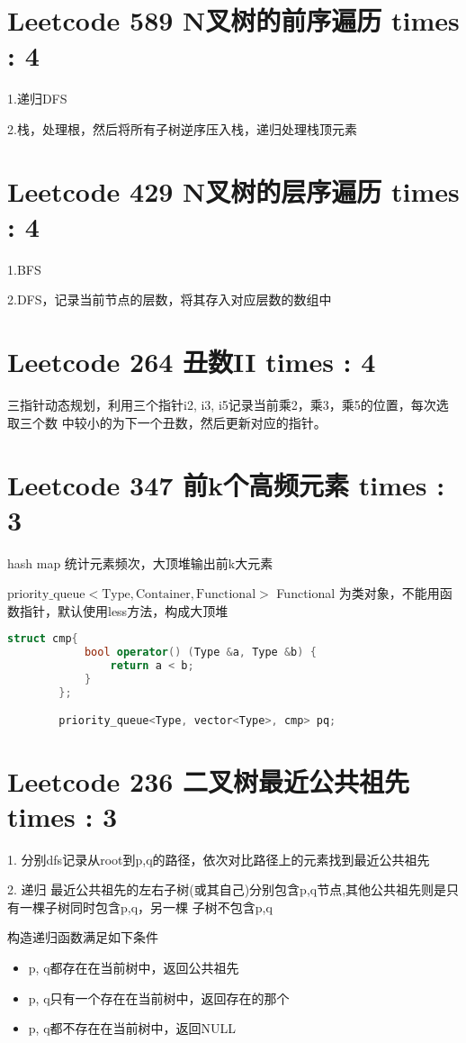\documentclass[UTF8]{ctexart}
\begin{document}
\section{Leetcode 589 N叉树的前序遍历 times : 4}
1.递归DFS

2.栈，处理根，然后将所有子树逆序压入栈，递归处理栈顶元素

\section{Leetcode 429 N叉树的层序遍历 times : 4}
1.BFS

2.DFS，记录当前节点的层数，将其存入对应层数的数组中

\section{Leetcode 264 丑数II times : 4}
三指针动态规划，利用三个指针i2, i3, i5记录当前乘2，乘3，乘5的位置，每次选取三个数
中较小的为下一个丑数，然后更新对应的指针。

\section{Leetcode 347 前k个高频元素 times : 3}
hash map 统计元素频次，大顶堆输出前k大元素

$\mathrm{priority\_queue<Type, Container, Functional>}$
Functional 为类对象，不能用函数指针，默认使用less方法，构成大顶堆
\begin{framed}
	\begin{lstlisting}[language=C++]
		struct cmp{
			bool operator() (Type &a, Type &b) {
				return a < b;
			}
		};

		priority_queue<Type, vector<Type>, cmp> pq;
	\end{lstlisting}
\end{framed}

\section{Leetcode 236 二叉树最近公共祖先 times : 3}
1. 分别dfs记录从root到p,q的路径，依次对比路径上的元素找到最近公共祖先

2. 递归
最近公共祖先的左右子树(或其自己)分别包含p,q节点,其他公共祖先则是只有一棵子树同时包含p,q，另一棵
子树不包含p,q

构造递归函数满足如下条件
\begin{itemize}
	\item p, q都存在在当前树中，返回公共祖先
	\item p, q只有一个存在在当前树中，返回存在的那个
	\item p, q都不存在在当前树中，返回NULL
\end{itemize}
\end{document}
